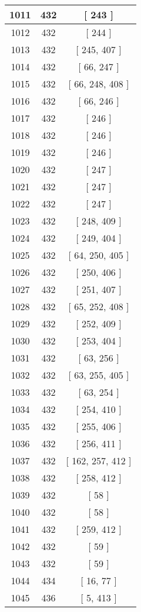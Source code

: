 \begin{center}
\begin{longtable}[H]{|| c c c ||}
\hline
1011 & 432 & [ 243 ] \\ 
\hline
1012 & 432 & [ 244 ] \\ 
\hline
1013 & 432 & [ 245, 407 ] \\ 
\hline
1014 & 432 & [ 66, 247 ] \\ 
\hline
1015 & 432 & [ 66, 248, 408 ] \\ 
\hline
1016 & 432 & [ 66, 246 ] \\ 
\hline
1017 & 432 & [ 246 ] \\ 
\hline
1018 & 432 & [ 246 ] \\ 
\hline
1019 & 432 & [ 246 ] \\ 
\hline
1020 & 432 & [ 247 ] \\ 
\hline
1021 & 432 & [ 247 ] \\ 
\hline
1022 & 432 & [ 247 ] \\ 
\hline
1023 & 432 & [ 248, 409 ] \\ 
\hline
1024 & 432 & [ 249, 404 ] \\ 
\hline
1025 & 432 & [ 64, 250, 405 ] \\ 
\hline
1026 & 432 & [ 250, 406 ] \\ 
\hline
1027 & 432 & [ 251, 407 ] \\ 
\hline
1028 & 432 & [ 65, 252, 408 ] \\ 
\hline
1029 & 432 & [ 252, 409 ] \\ 
\hline
1030 & 432 & [ 253, 404 ] \\ 
\hline
1031 & 432 & [ 63, 256 ] \\ 
\hline
1032 & 432 & [ 63, 255, 405 ] \\ 
\hline
1033 & 432 & [ 63, 254 ] \\ 
\hline
1034 & 432 & [ 254, 410 ] \\ 
\hline
1035 & 432 & [ 255, 406 ] \\ 
\hline
1036 & 432 & [ 256, 411 ] \\ 
\hline
1037 & 432 & [ 162, 257, 412 ] \\ 
\hline
1038 & 432 & [ 258, 412 ] \\ 
\hline
1039 & 432 & [ 58 ] \\ 
\hline
1040 & 432 & [ 58 ] \\ 
\hline
1041 & 432 & [ 259, 412 ] \\ 
\hline
1042 & 432 & [ 59 ] \\ 
\hline
1043 & 432 & [ 59 ] \\ 
\hline
1044 & 434 & [ 16, 77 ] \\ 
\hline
1045 & 436 & [ 5, 413 ] \\ 

\end{longtable}
\end{center}
